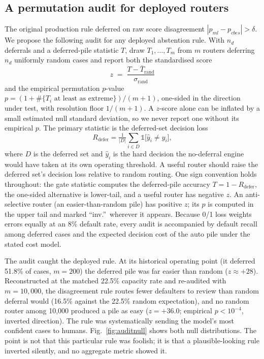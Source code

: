 \documentclass[conference]{IEEEtran}
\begin{document}
\subsection{A permutation audit for deployed routers}
The original production rule deferred on raw score disagreement
$|p_{ml}-p_{cbes}| > \delta$. We propose the following audit for any
deployed abstention rule. With $n_d$ deferrals and a deferred-pile statistic
$T$, draw $T_1,\dots,T_m$ from $m$ routers deferring $n_d$ uniformly random
cases and report both the standardised score
\begin{equation}
z \;=\; \frac{T - \bar{T}_{\mathrm{rand}}}{\sigma_{\mathrm{rand}}}
\label{eq:audit}
\end{equation}
and the empirical permutation $p$-value
$p = (1 + \#\{T_i \text{ at least as extreme}\})/(m+1)$, one-sided in the
direction under test, with resolution floor $1/(m+1)$. A $z$-score alone can
be inflated by a small estimated null standard deviation, so we never
report one without its empirical $p$. The primary statistic is the
deferred-set decision loss
\begin{equation}
R_{\mathrm{defer}} = \tfrac{1}{|D|}\textstyle\sum_{i \in D}
\mathbb{1}\big[\hat{y}_i \neq y_i\big],
\label{eq:rdefer}
\end{equation}
where $D$ is the deferred set and $\hat{y}_i$ is the hard decision the
no-deferral engine would have taken at its own operating threshold. A
useful router should raise the deferred set's decision loss relative to
random routing. One sign convention holds throughout: the gate statistic
computes the deferred-pile accuracy $T = 1 - R_{\mathrm{defer}}$, the
one-sided alternative is lower-tail, and a useful router has negative $z$.
An anti-selective router (an easier-than-random pile) has positive $z$; its
$p$ is computed in the upper tail and marked ``inv.''\ wherever it appears.
Because 0/1 loss weights errors equally at an 8\% default rate, every audit
is accompanied by default recall among deferred cases and the expected
decision cost of the auto pile under the stated cost model.

The audit caught the deployed rule. At its historical operating point (it
deferred 51.8\% of cases, $m=200$) the deferred pile was far easier than
random ($z \approx +28$). Reconstructed at the matched 22.5\% capacity rate
and re-audited with $m = 10{,}000$, the disagreement rule routes fewer
defaulters to review than random deferral would (16.5\% against the 22.5\%
random expectation), and no random router among 10{,}000 produced a pile as
easy ($z = +36.0$; empirical $p < 10^{-4}$, inverted direction). The rule
was systematically sending the model's most confident cases to humans.
Fig.~\ref{fig:auditnull} shows both null distributions. The point is not
that this particular rule was foolish; it is that a plausible-looking rule
inverted silently, and no aggregate metric showed it.
\end{document}
